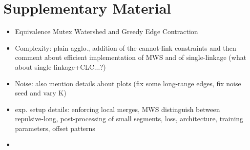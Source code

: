
\section{Supplementary Material}
\begin{itemize}
\item Equivalence Mutex Watershed and Greedy Edge Contraction
\item Complexity: plain agglo., addition of the cannot-link constraints and then comment about efficient implementation of MWS and of single-linkage (what about single linkage+CLC...?)
\item Noise: also mention details about plots (fix some long-range edges, fix noise seed and vary K)
\item exp. setup details: enforcing local merges, MWS distinguish between repulsive-long, post-processing of small segments, loss, architecture, training parameters, offset patterns
\item 

\end{itemize}


